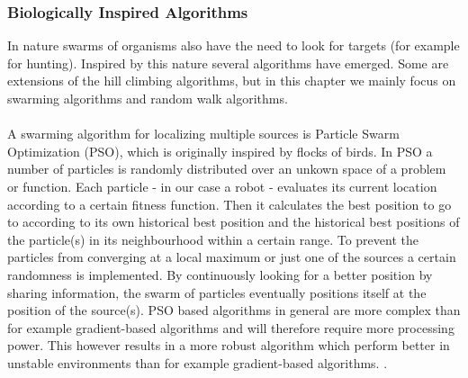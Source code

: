 	\subsubsection{Biologically Inspired Algorithms}
		\label{subsubsec:BiologicallyInspired}
		In nature swarms of organisms also have the need to look for targets (for example for hunting). Inspired by this nature several algorithms have emerged. Some are extensions of the hill climbing algorithms, but in this chapter we mainly focus on swarming algorithms and random walk algorithms.\\
		\\
		A swarming algorithm for localizing multiple sources is Particle Swarm Optimization (PSO), which is originally inspired by flocks of birds.
		In PSO a number of particles is randomly distributed over an unkown space of a problem or function. 
		Each particle - in our case a robot - evaluates its current location according to a certain fitness function.
		Then it calculates the best position to go to according to its own historical best position and the historical best positions of the particle(s) in its neighbourhood within a certain range.
		To prevent the particles from converging at a local maximum or just one of the sources a certain randomness is implemented. 
		By continuously looking for a better position by sharing information, the swarm of particles eventually positions itself at the position of the source(s). \cite{poli2007particle} 
		PSO based algorithms in general are more complex than for example gradient-based algorithms and will therefore require more processing power.
		This however results in a more robust algorithm which perform better in unstable environments than for example gradient-based algorithms. \cite{marques2006particle}.
